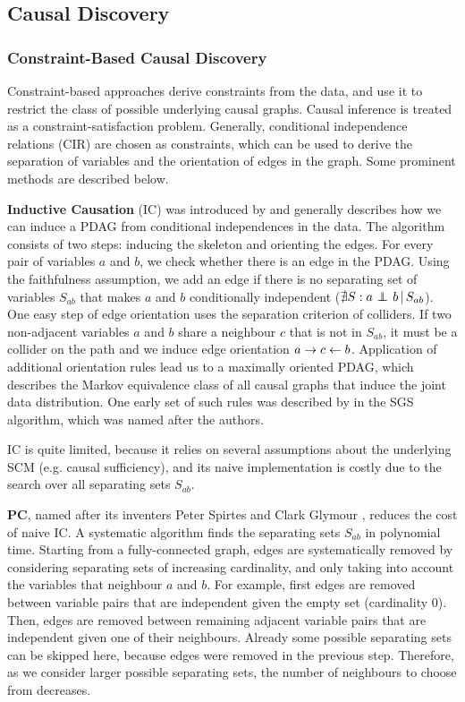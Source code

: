 \subsection*{Causal Discovery}

\subsubsection*{Constraint-Based Causal Discovery}
Constraint-based approaches derive constraints from the data, and use it to restrict the class of possible underlying causal graphs. Causal inference is treated as a constraint-satisfaction problem. Generally, conditional independence relations (CIR) are chosen as constraints, which can be used to derive the separation of variables and the orientation of edges in the graph. Some prominent methods are described below.

\textbf{Inductive Causation} (IC) was introduced by \citet{verma1991equivalence} and generally describes how we can induce a PDAG from conditional independences in the data. The algorithm consists of two steps: inducing the skeleton and orienting the edges. For every pair of variables $a$ and $b$, we check whether there is an edge in the PDAG. Using the faithfulness assumption, we add an edge if there is no separating set of variables $S_{ab}$ that makes $a$ and $b$ conditionally independent ($\nexists S : {a} \operatorname*{{\,\perp\mkern-12mu\perp\,}}_{} {b} \,|\, {S_{ab}}$). One easy step of edge orientation uses the separation criterion of colliders. If two non-adjacent variables $a$ and $b$ share a neighbour $c$ that is not in $S_{ab}$, it must be a collider on the path and we induce edge orientation $a\to c \leftarrow b$. Application of additional orientation rules lead us to a maximally oriented PDAG, which describes the Markov equivalence class of all causal graphs that induce the joint data distribution. One early set of such rules was described by \citet{spirtes2000causation} in the SGS algorithm, which was named after the authors.
            
IC is quite limited, because it relies on several assumptions about the underlying SCM (e.g. causal sufficiency), and its naive implementation is costly due to the search over all separating sets $S_{ab}$.

\textbf{PC}, named after its inventers Peter Spirtes and Clark Glymour \citep{spirtes1991algorithm}, reduces the cost of naive IC. A systematic algorithm finds the separating sets $S_{ab}$ in polynomial time. Starting from a fully-connected graph, edges are systematically removed by considering separating sets of increasing cardinality, and only taking into account the variables that neighbour $a$ and $b$. For example, first edges are removed between variable pairs that are independent given the empty set (cardinality 0). Then, edges are removed between remaining adjacent variable pairs that are independent given one of their neighbours. Already some possible separating sets can be skipped here, because edges were removed in the previous step. Therefore, as we consider larger possible separating sets, the number of neighbours to choose from decreases.
            
